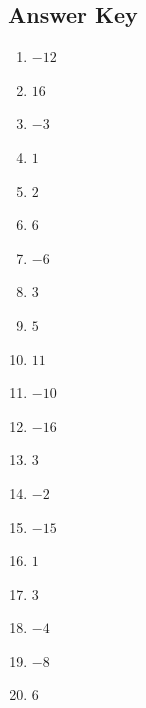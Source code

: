 \documentclass{article}
\begin{document}
\newpage

\subsection*{Answer Key}

\begin{enumerate}
\item $\displaystyle -12 $ \ 
\item $\displaystyle 16 $ \ 
\item $\displaystyle -3 $ \ 
\item $\displaystyle 1 $ \ 
\item $\displaystyle 2 $ \ 
\item $\displaystyle 6 $ \ 
\item $\displaystyle -6 $ \ 
\item $\displaystyle 3 $ \ 
\item $\displaystyle 5 $ \ 
\item $\displaystyle 11 $ \ 
\item $\displaystyle -10 $ \ 
\item $\displaystyle -16 $ \ 
\item $\displaystyle 3 $ \ 
\item $\displaystyle -2 $ \ 
\item $\displaystyle -15 $ \ 
\item $\displaystyle 1 $ \ 
\item $\displaystyle 3 $ \ 
\item $\displaystyle -4 $ \ 
\item $\displaystyle -8 $ \ 
\item $\displaystyle 6 $ \ 

\end{enumerate}
\end{document}

